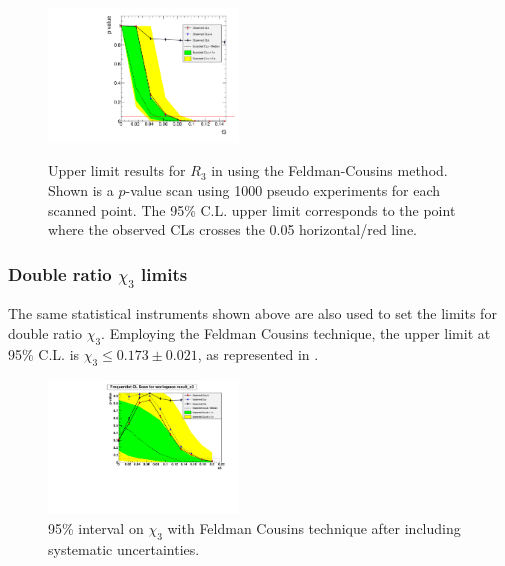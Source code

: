 \begin{figure}[hbtp]
  \begin{center}
{\includegraphics[angle=0,width=0.45\textwidth]{figures/limits/FC_0100}}
   \caption{Upper limit results for $R_3$ in \PbPb using the Feldman-Cousins method.
Shown is a $p$-value scan using 1000 pseudo experiments for each scanned point.  
The 95\% C.L. upper limit corresponds to the point where the observed CLs crosses the 0.05 horizontal/red line. 
}
    \label{fig:FC_results}
  \end{center}
\end{figure}



\subsubsection{Double ratio $\chi_{3}$ limits}

The same statistical instruments shown above are also used to set the limits for double ratio $\chi_{3}$.
Employing the Feldman Cousins technique, the upper limit at 95\% C.L. 
 is $\chi_{3} \leq 0.173 \pm 0.021$,  
as represented in . 

\begin{figure}[hbtp]
  \begin{center}
    \includegraphics[angle=0,width=0.45\textwidth]{figures/limits/FC_chi3_0100.pdf}
    \caption{95\% interval on $\chi_{3}$ with Feldman Cousins technique after including systematic uncertainties. }
    \label{fig:FCx3_0100}
  \end{center}
\end{figure}


